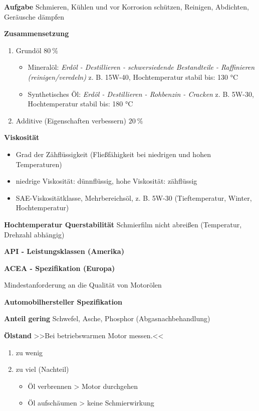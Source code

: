 \textbf{Aufgabe} Schmieren, Kühlen und vor Korrosion schützen, Reinigen,
Abdichten, Geräusche dämpfen

\textbf{Zusammensetzung}

\begin{enumerate}
\item
  Grundöl $80~\%$

  \begin{itemize}
  \item
    Mineralöl: \emph{Erdöl - Destillieren - schwersiedende Bestandteile
    - Raffinieren (reinigen/veredeln)} z. B. 15W-40, Hochtemperatur
    stabil bis: 130 °C
  \item
    Synthetisches Öl: \emph{Erdöl - Destillieren - Rohbenzin - Cracken}
    z. B. 5W-30, Hochtemperatur stabil bis: 180 °C
  \end{itemize}
\item
  Additive (Eigenschaften verbessern) $20~\%$
\end{enumerate}

\textbf{Viskosität}

\begin{itemize}
\item
  Grad der Zähflüssigkeit (Fließfähigkeit bei niedrigen und hohen
  Temperaturen)
\item
  niedrige Viskosität: dünnflüssig, hohe Viskosität: zähflüssig
\item
  SAE-Viskositätklasse, Mehrbereichsöl, z. B. 5W-30 (Tieftemperatur,
  Winter, Hochtemperatur)
\end{itemize}

\textbf{Hochtemperatur Querstabilität} Schmierfilm nicht abreißen
(Temperatur, Drehzahl abhängig)

\textbf{API - Leistungsklassen (Amerika)}

\textbf{ACEA - Spezifikation (Europa)}

Mindestanforderung an die Qualität von Motorölen

\textbf{Automobilhersteller Spezifikation}

\textbf{Anteil gering} Schwefel, Asche, Phosphor (Abgasnachbehandlung)

\textbf{Ölstand} >>Bei betriebswarmen Motor messen.<<

\begin{enumerate}
\item
  zu wenig
\item
  zu viel (Nachteil)

  \begin{itemize}
  \item
    Öl verbrennen > Motor durchgehen
  \item
    Öl aufschäumen > keine Schmierwirkung
  \end{itemize}
\end{enumerate}

